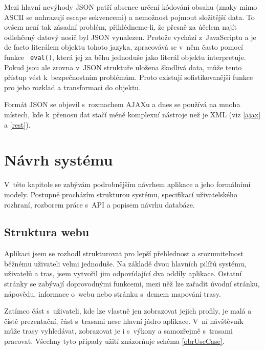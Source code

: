 Mezi hlavní nevýhody JSON patří absence určení kódování obsahu
(znaky mimo ASCII se nahrazují escape sekvencemi) a nemožnost pojmout
složitější data. To ovšem není tak zásadní problém,
přihlédneme-li, že přesně za účelem najít odlehčený datový nosič byl
JSON vynalezen. Protože vychází z~JavaScriptu a je de facto literálem
objektu tohoto jazyka, zpracovává se v~něm často pomocí funkce {\tt
eval()}, která jej za běhu jednoduše jako literál objektu
interpretuje. Pokud jsou ale zrovna v~JSON struktuře uložena škodlivá
data, může tento přístup vést k~bezpečnostním problémům. Proto
existují sofistikovanější funkce pro jeho rozklad a transformaci do
objektu. \cite{json}

Formát JSON se objevil s~rozmachem AJAXu a dnes se používá na mnoha
místech, kde k~přenosu dat stačí méně komplexní nástroje než je XML
(viz \ref{ajax} a \ref{rest}).

\chapter{Návrh systému}
V~této kapitole se zabývám podrobnějším návrhem aplikace a jeho
formálními modely. Postupně procházím strukturou systému, specifikací
uživatelského rozhraní, rozborem práce s~API a popisem návrhu databáze. 

\section{Struktura webu}
Aplikaci jsem se rozhodl strukturovat pro lepší přehlednost a
srozumitelnost běžnému uživateli velmi jednoduše. Na základě dvou
hlavních pilířů systému, uživatelů a tras, jsem vytvořil jim
odpovídající dva oddíly aplikace. Ostatní stránky se zabývají
doprovodnými funkcemi, mezi něž lze zařadit úvodní stránku, nápovědu,
informace o~webu nebo stránku s~demem mapování trasy.

Zatímco část s~uživateli, kde lze vlastně jen zobrazovat jejich
profily, je malá a čistě prezentační, část s~trasami nese hlavní
jádro aplikace. V~ní návštěvník může trasy vyhledávat, zobrazovat je
i s~výkony a samozřejmě s~trasami pracovat. Všechny tyto případy
užití znázorňuje schéma \ref{obrUseCase}.

